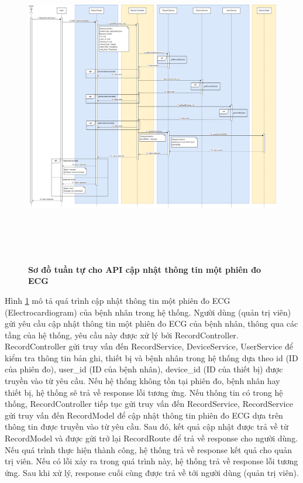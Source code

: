  \begin{figure}[H]
  \centering
  \includegraphics[width=16cm,height=14cm]{Images/sequence_api/editRecordById.png}
  \caption[Sơ đồ tuần tự cho API cập nhật thông tin một phiên đo ECG ]{\bfseries \fontsize{12pt}{0pt}
  \selectfont Sơ đồ tuần tự cho API cập nhật thông tin một phiên đo ECG }
  \label{api_editRecordById} %
\end{figure}
Hình \ref{api_editRecordById} mô tả quá trình cập nhật thông tin một phiên đo ECG (Electrocardiogram) của bệnh nhân trong hệ thống. Người dùng (quản trị viên) gửi yêu cầu cập nhật thông tin một phiên đo ECG của bệnh nhân, thông qua các tầng của hệ thống, 
yêu cầu này được xử lý bởi RecordController. RecordController gửi truy vấn đến RecordService, DeviceService, UserService để kiểm tra thông tin bản ghi, thiết bị và bệnh nhân trong hệ thống dựa theo id (ID của phiên đo), user\_id (ID của bệnh nhân), device\_id (ID của thiết bị)
 được truyền vào từ yêu cầu. Nếu hệ thống không tồn tại phiên đo, bệnh nhân hay thiết bị, hệ thống sẽ trả về response lỗi tương ứng. Nếu thông tin có trong hệ thống, RecordController tiếp tục gửi truy vấn đến RecordService, RecordService gửi truy vấn đến RecordModel để cập nhật thông tin
phiên đo ECG dựa trên thông tin được truyền vào từ yêu cầu. Sau đó, kết quả cập nhật được trả về từ RecordModel và được gửi trở lại RecordRoute để trả về response cho người dùng. Nếu quá trình thực hiện thành công, hệ thống trả về response kết quả cho quản trị viên. Nếu có lỗi xảy ra
 trong quá trình này, hệ thống trả về response lỗi tương ứng. Sau khi xử lý, response cuối cùng được trả về tới người dùng (quản trị viên).


